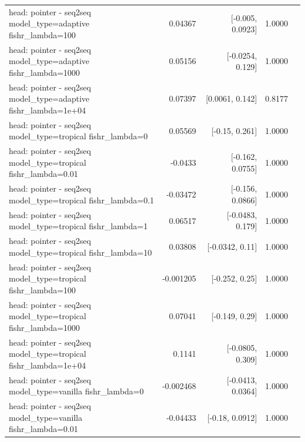\documentclass[10pt]{article}
\makeatletter
\newcommand{\stackcell}[1]{\begin{tabular}[t]{@{}l@{}}#1\end{tabular}}
\makeatother
\begin{document}
{\begin{longtable}{lrrrl}
\stackcell{head: pointer - seq2seq\\\footnotesize model\_type=adaptive fishr\_lambda=100 } & 0.04367 & [-0.005, 0.0923] & 1.0000 & \\
\stackcell{head: pointer - seq2seq\\\footnotesize model\_type=adaptive fishr\_lambda=1000 } & 0.05156 & [-0.0254, 0.129] & 1.0000 & \\
\stackcell{head: pointer - seq2seq\\\footnotesize model\_type=adaptive fishr\_lambda=1e+04 } & 0.07397 & [0.0061, 0.142] & 0.8177 & \\
\stackcell{head: pointer - seq2seq\\\footnotesize model\_type=tropical fishr\_lambda=0 } & 0.05569 & [-0.15, 0.261] & 1.0000 & \\
\stackcell{head: pointer - seq2seq\\\footnotesize model\_type=tropical fishr\_lambda=0.01 } & -0.0433 & [-0.162, 0.0755] & 1.0000 & \\
\stackcell{head: pointer - seq2seq\\\footnotesize model\_type=tropical fishr\_lambda=0.1 } & -0.03472 & [-0.156, 0.0866] & 1.0000 & \\
\stackcell{head: pointer - seq2seq\\\footnotesize model\_type=tropical fishr\_lambda=1 } & 0.06517 & [-0.0483, 0.179] & 1.0000 & \\
\stackcell{head: pointer - seq2seq\\\footnotesize model\_type=tropical fishr\_lambda=10 } & 0.03808 & [-0.0342, 0.11] & 1.0000 & \\
\stackcell{head: pointer - seq2seq\\\footnotesize model\_type=tropical fishr\_lambda=100 } & -0.001205 & [-0.252, 0.25] & 1.0000 & \\
\stackcell{head: pointer - seq2seq\\\footnotesize model\_type=tropical fishr\_lambda=1000 } & 0.07041 & [-0.149, 0.29] & 1.0000 & \\
\stackcell{head: pointer - seq2seq\\\footnotesize model\_type=tropical fishr\_lambda=1e+04 } & 0.1141 & [-0.0805, 0.309] & 1.0000 & \\
\stackcell{head: pointer - seq2seq\\\footnotesize model\_type=vanilla fishr\_lambda=0 } & -0.002468 & [-0.0413, 0.0364] & 1.0000 & \\
\stackcell{head: pointer - seq2seq\\\footnotesize model\_type=vanilla fishr\_lambda=0.01 } & -0.04433 & [-0.18, 0.0912] & 1.0000 & \\

\end{longtable}}
\end{document}
